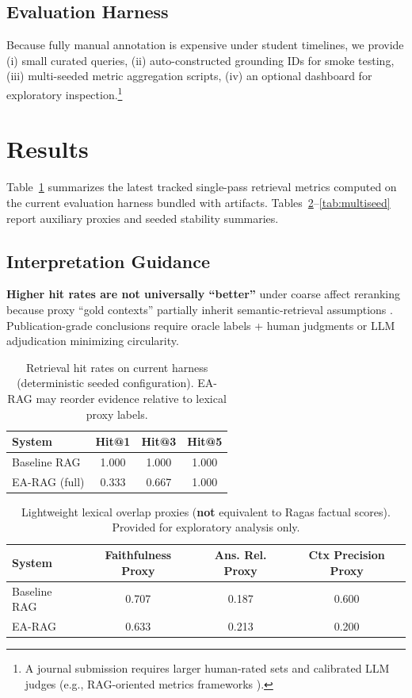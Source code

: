 \documentclass[conference]{IEEEtran}
\begin{document}
\subsection{Evaluation Harness}
Because fully manual annotation is expensive under student timelines, we provide (i) small curated queries, (ii) auto-constructed grounding IDs for smoke testing, (iii) multi-seeded metric aggregation scripts, (iv) an optional dashboard for exploratory inspection.\footnote{A journal submission requires larger human-rated sets and calibrated LLM judges (e.g., RAG-oriented metrics frameworks \cite{ragas2023}).}

\section{Results}
\label{sec:results}
Table~\ref{tab:main-single} summarizes the latest tracked single-pass retrieval metrics computed on the current evaluation harness bundled with artifacts. Tables~\ref{tab:proxies}--\ref{tab:multiseed} report auxiliary proxies and seeded stability summaries.

\subsection{Interpretation Guidance}
\textbf{Higher hit rates are not universally ``better''} under coarse affect reranking because proxy ``gold contexts'' partially inherit semantic-retrieval assumptions \cite{lewis2020rag}. Publication-grade conclusions require oracle labels + human judgments or LLM adjudication minimizing circularity.

\begin{table}[t]
\centering
\begin{tabular}{lccc}
\toprule
System & Hit@1 & Hit@3 & Hit@5 \\
\midrule
Baseline RAG & 1.000 & 1.000 & 1.000 \\
EA-RAG (full) & 0.333 & 0.667 & 1.000 \\
\bottomrule
\end{tabular}
\caption{Retrieval hit rates on current harness (deterministic seeded configuration). EA-RAG may reorder evidence relative to lexical proxy labels.}
\label{tab:main-single}
\end{table}

\begin{table}[t]
\centering
\begin{tabular}{lccc}
\toprule
System & Faithfulness Proxy & Ans. Rel. Proxy & Ctx Precision Proxy \\
\midrule
Baseline RAG & 0.707 & 0.187 & 0.600 \\
EA-RAG       & 0.633 & 0.213 & 0.200 \\
\bottomrule
\end{tabular}
\caption{Lightweight lexical overlap proxies (\textbf{not} equivalent to Ragas factual scores). Provided for exploratory analysis only.}
\label{tab:proxies}
\end{table}
\end{document}
